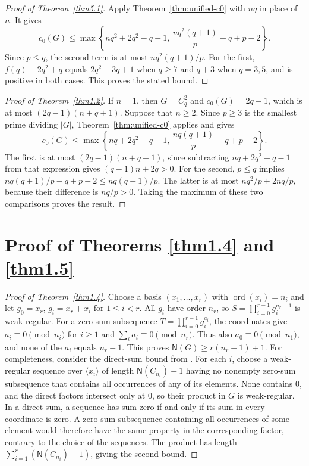 \documentclass[10pt,a4paper]{amsart}
\theoremstyle{definition}
\theoremstyle{remark}
\numberwithin{equation}{section}
\DeclareMathOperator{\ord}{ord}
\begin{document}
\begin{proof}[Proof of Theorem~\ref{thm5.1}]
Apply Theorem~\ref{thm:unified-c0} with $nq$ in place of $n$. It gives
\[
c_0(G)\le\max\left\{nq^2+2q^2-q-1,\,
\frac{nq^2(q+1)}p-q+p-2\right\}.
\]
Since $p\le q$, the second term is at most $nq^2(q+1)/p$.
For the first, $f(q)-2q^2+q$ equals $2q^2-3q+1$ when $q\ge7$
and $q+3$ when $q=3,5$, and is positive in both cases.
This proves the stated bound.
\end{proof}

\begin{proof}[Proof of Theorem~\ref{thm1.2}]
If $n=1$, then $G=C_q^2$ and $c_0(G)=2q-1$, which is at most
$(2q-1)(n+q+1)$.
Suppose that $n\ge2$. Since $p\ge3$ is the smallest prime dividing
$|G|$, Theorem~\ref{thm:unified-c0} applies and gives
\[
c_0(G)\le\max\left\{nq+2q^2-q-1,\,
\frac{nq(q+1)}p-q+p-2\right\}.
\]
The first is at most $(2q-1)(n+q+1)$, since subtracting
$nq+2q^2-q-1$ from that expression gives $(q-1)n+2q>0$.
For the second, $p\le q$ implies
$nq(q+1)/p-q+p-2\le nq(q+1)/p$.
The latter is at most $nq^2/p+2nq/p$, because their difference is
$nq/p>0$.
Taking the maximum of these two comparisons proves the result.
\end{proof}

\section{Proof of Theorems \ref{thm1.4} and \ref{thm1.5}}

\begin{proof}[Proof of Theorem~\ref{thm1.4}]
Choose a basis $(x_1,\ldots,x_r)$ with $\ord(x_i)=n_i$ and let
$g_0=x_r$, $g_i=x_r+x_i$ for $1\le i<r$.
All $g_i$ have order $n_r$, so $S=\prod_{i=0}^{r-1}g_i^{n_r-1}$ is weak-regular.
For a zero-sum subsequence $T=\prod_{i=0}^{r-1}g_i^{a_i}$, the coordinates give
$a_i\equiv0\pmod{n_i}$ for $i\ge1$ and $\sum_i a_i\equiv0\pmod{n_r}$.
Thus also $a_0\equiv0\pmod{n_1}$, and none of the $a_i$ equals $n_r-1$.
This proves $\mathsf{N}(G)\ge r(n_r-1)+1$.
For completeness, consider the direct-sum bound from
\cite[Theorem~1.1(2)]{[GHHLYZ2022-2]}.
For each $i$, choose a weak-regular sequence over $\langle x_i\rangle$
of length $\mathsf N(C_{n_i})-1$ having no nonempty zero-sum subsequence
that contains all occurrences of any of its elements.
None contains $0$, and the direct factors intersect only at $0$, so their
product in $G$ is weak-regular.
In a direct sum, a sequence has sum zero if and only if its sum in every
coordinate is zero. A zero-sum subsequence containing all occurrences of
some element would therefore have the same property in the corresponding
factor, contrary to the choice of the sequences. The product has length
$\sum_{i=1}^r(\mathsf N(C_{n_i})-1)$, giving the second bound.
\end{proof}
\end{document}

